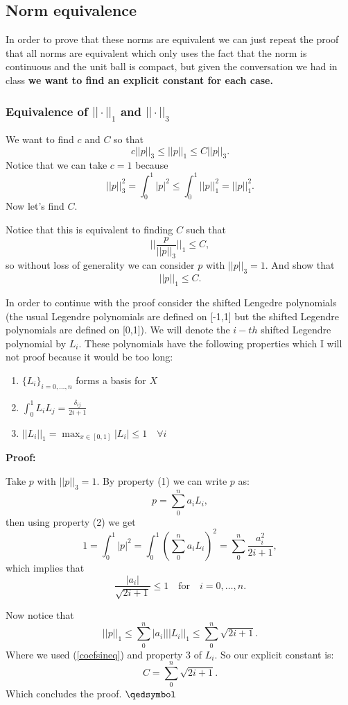 \documentclass{article}
\begin{document}
\subsection*{Norm equivalence}
In order to prove that these norms are equivalent we can just repeat the proof
that all norms are equivalent which only uses the fact that the norm is
continuous and the unit ball is compact, but given the conversation we had in
class \textbf{we want to find an explicit constant for each case.}
\subsubsection*{Equivalence of $||\cdot||_1$ and $||\cdot||_3$}
We want to find $c$ and $C$ so that
\[
	c||p||_3\leq ||p||_1 \leq C||p||_3.
\]
Notice that we can take $c=1$ because
\[
||p||_3^2=\int_0^1|p|^2\leq \int_0^1||p||_1^2=||p||_1^2.
\]
Now let's find $C$.

Notice that this is equivalent to finding $C$ such that
\[
	\bigg|\bigg|\frac{p}{||p||_3}\bigg|\bigg|_1\leq C,
\]
so without loss of generality we can consider $p$ with $||p||_3=1$. And show that
\[
	||p||_1\leq C.
\]

In order to continue with the proof consider the shifted Lengedre polynomials
(the usual Legendre polynomials are defined on [-1,1] but the shifted Legendre
polynomials are defined on [0,1]). We will denote the $i-th$ shifted Legendre
polynomial by $L_i$. These polynomials have the following properties which I
will not proof because it would be too long:
\begin{enumerate}
	\item $\{L_i\}_{i=0,\dots,n}$ forms a basis for $X$
	\item $\int_0^1 L_iL_j=\frac{\delta_{ij}}{2i+1}$
	\item $||L_i||_1=\max_{x\in[0,1]}|L_i|\leq 1 \quad \forall i$
\end{enumerate}

\textbf{Proof:}

Take $p$ with $||p||_3=1$. By property (1) we can write $p$ as:
\[
	p=\sum_0^n a_iL_i,
\]
then using property (2) we get
\[
	1=\int_0^1|p|^2=\int_0^1\left(\sum_0^na_iL_i\right)^2=\sum_0^n\frac{a_i^2}{2i+1},
\]
which implies that
\begin{equation}\label{coefsineq}
	\frac{|a_i|}{\sqrt{2i+1}}\leq 1 \quad \text{for} \quad i=0,\dots,n.
\end{equation}

Now notice that
\[
	||p||_1\leq\sum_0^n|a_i|||L_i||_1 \leq \sum_0^n\sqrt{2i+1}.
\]
Where we used (\ref{coefsineq}) and property 3 of $L_i$. So our explicit
constant is:
\[
	C=\sum_0^n\sqrt{2i+1}.
\]
Which concludes the proof. $\qedsymbol$
\end{document}
